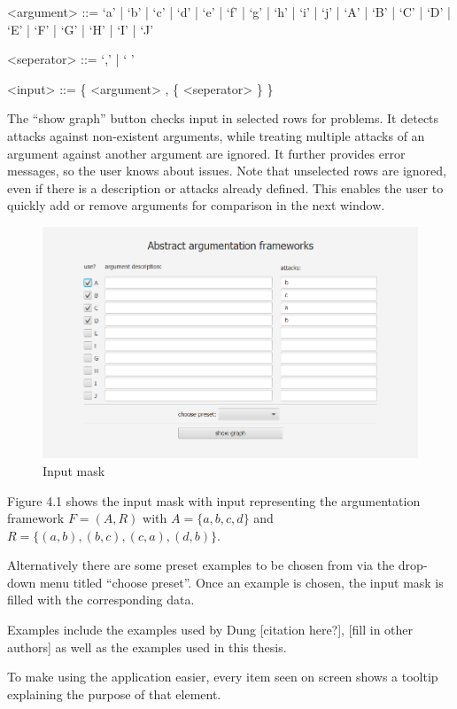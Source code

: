 \documentclass[draft,final]{vutinfth} %
\newcommand{\hl}{\par\vspace{6pt}} %
\begin{document}
\begin{grammar}%
	<argument> ::= `a' | `b' | `c' | `d' | `e' | `f'
				| `g' | `h' | `i' | `j' | `A' | `B'
				| `C' | `D' | `E' | `F' | `G' | `H'
				| `I' | `J'

	<seperator> ::= `,' | ` '
	
	<input> ::= \{ <argument> , \{ <seperator> \} \}
\end{grammar}\hl

The ``show graph'' button checks input in selected rows for problems. It detects attacks against non-existent arguments, while treating multiple attacks of an argument against another argument are ignored. It further provides error messages, so the user knows about issues. Note that unselected rows are ignored, even if there is a description or attacks already defined. This enables the user to quickly add or remove arguments for comparison in the next window.\hl

\FloatBarrier
	\begin{figure}[!h]
		\centering
		\includegraphics[width=\linewidth]{pics/input.png}
		\caption{Input mask}
	\end{figure}
\FloatBarrier

Figure 4.1 shows the input mask with input representing the argumentation framework $F=(A,R)$ with $A=\{a,b,c,d\}$ and $R=\{(a,b),(b,c),(c,a),(d,b)\}$.\hl

Alternatively there are some preset examples to be chosen from via the drop-down menu titled ``choose preset''. Once an example is chosen, the input mask is filled with the corresponding data.\hl
Examples include the examples used by Dung [citation here?], [fill in other authors] as well as the examples used in this thesis.\hl
To make using the application easier, every item seen on screen shows a tooltip explaining the purpose of that element.
\end{document}
